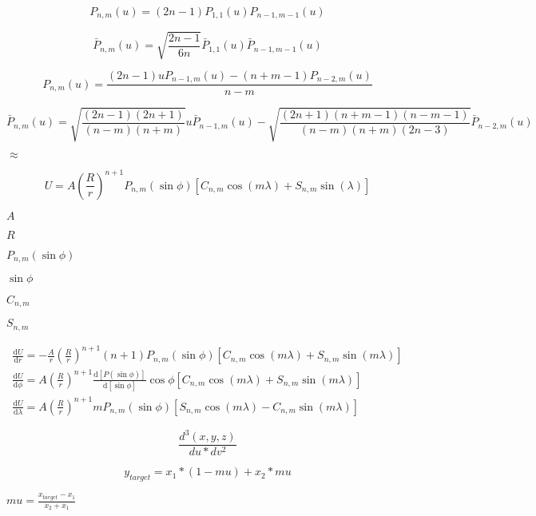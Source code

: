 \documentclass{article}
\begin{document}
\[ P_{ n, m }( u ) = ( 2 n - 1 ) P_{ 1, 1 }( u ) P_{ n - 1, m - 1 }( u ) \]
\pagebreak

\[ \bar{ P }_{ n, m }( u ) = \sqrt{ \frac{ 2 n - 1 }{ 6 n } } \bar{ P }_{ 1, 1 }( u ) \bar{ P }_{ n - 1, m - 1 }( u ) \]
\pagebreak

\[ P_{ n, m }( u ) = \frac{ ( 2 n - 1 ) u P_{ n - 1, m }( u ) - ( n + m - 1 ) P_{ n - 2, m }( u ) }{ n - m } \]
\pagebreak

\[ \bar{ P }_{ n, m }( u ) = \sqrt{ \frac{ ( 2 n - 1 )( 2 n + 1 ) }{ ( n - m ) ( n + m ) } } u \bar{ P }_{ n - 1, m }( u ) - \sqrt{ \frac{ ( 2 n + 1 )( n + m - 1 ) ( n - m - 1 ) } { ( n - m)( n + m )( 2 n - 3 ) } } \bar{ P }_{ n - 2, m }( u ) \]
\pagebreak

$\approx$
\pagebreak

\[ U = A \left( \frac{ R }{ r} \right) ^{ n + 1} P _{ n, m } ( \sin \phi ) \left[ C _{ n, m } \cos( m \lambda ) + S _{ n, m } \sin( \lambda ) \right] \]
\pagebreak

$ A $
\pagebreak

$ R $
\pagebreak

$ P _{ n, m }( \sin \phi ) $
\pagebreak

$ \sin \phi $
\pagebreak

$ C _{ n, m } $
\pagebreak

$ S _{ n, m } $
\pagebreak

\begin{eqnarray*} \frac{ \mathrm{ d } U }{ \mathrm{ d } r } = -\frac{ A }{ r } \left( \frac{ R }{ r } \right) ^{ n + 1 } ( n + 1 ) P_{ n, m }( \sin \phi )[ C_{ n, m } \cos( m \lambda ) + S_{ n,m } \sin( m \lambda ) ] \\ \frac{ \mathrm{ d } U }{ \mathrm{ d } \phi } = A \left( \frac{ R }{ r } \right)^{ n + 1 } \frac{ \mathrm{ d } [ P( \sin \phi ) ] }{ \mathrm{ d } [ \sin \phi ] } \cos \phi [ C_{ n, m } \cos( m \lambda ) + S_{ n, m } \sin( m \lambda ) ] \\ \frac{ \mathrm{ d } U }{ \mathrm{ d } \lambda } = A \left( \frac{ R }{ r } \right)^{ n + 1 } m P_{ n, m }( \sin \phi ) [ S_{ n, m } \cos( m \lambda ) - C_{ n, m } \sin( m \lambda ) ] \end{eqnarray*}
\pagebreak

\[ \frac{ d^{ 3 } ( x, y, z ) } { du * dv^{ 2 } } \]
\pagebreak

\[ y_{target} = x_{1} * ( 1 - mu ) + x_{2} * mu \]
\pagebreak

$ mu = \frac{ x_{target} - x_{1} } { x_{2} + x_{1} } $
\pagebreak
\end{document}
